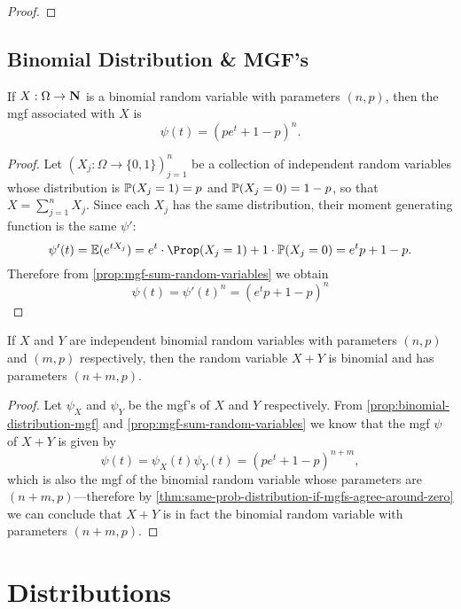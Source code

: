 \begin{proof}
\end{proof}

\subsection{Binomial Distribution \& MGF's}

\begin{proposition}
\label{prop:binomial-distribution-mgf}
If \(X: \Omega \to \mathbf{N}\) is a binomial random variable with parameters
\((n, p)\), then the mgf associated with \(X\) is
\[
\psi(t) = (p e^t + 1 - p)^n.
\]
\end{proposition}

\begin{proof}
Let \((X_j: \Omega \to \{0, 1\})_{j=1}^n\) be a collection of independent random
variables whose distribution is \(\operatorname{\mathbb{P}}(X_j = 1) = p\) and
\(\operatorname{\mathbb{P}}(X_j = 0) = 1 - p\), so that \(X = \sum_{j=1}^n X_j\). Since each \(X_j\)
has the same distribution, their moment generating function is the same \(\psi'\):
\[
\psi'(t)
= \Expect(e^{t X_j})
= e^t \cdot \Prop(X_j = 1) + 1 \cdot \Prob(X_j = 0)
= e^t p + 1 - p.
\]
Therefore from \cref{prop:mgf-sum-random-variables} we obtain
\[
\psi(t) = \psi'(t)^n = (e^t p + 1 - p)^n
\]
\end{proof}

\begin{theorem}
\label{thm:additivity-binomial-random-variables}
If \(X\) and \(Y\) are independent binomial random variables with parameters
\((n, p)\) and \((m, p)\) respectively, then the random variable \(X + Y\) is
binomial and has parameters \((n + m, p)\).
\end{theorem}

\begin{proof}
Let \(\psi_X\) and \(\psi_Y\) be the mgf's of \(X\) and \(Y\) respectively. From
\cref{prop:binomial-distribution-mgf} and \cref{prop:mgf-sum-random-variables} we
know that the mgf \(\psi\) of \(X + Y\) is given by
\[
\psi(t) = \psi_X(t) \psi_Y(t) = (p e^t + 1 - p)^{n+m},
\]
which is also the mgf of the binomial random variable whose parameters are
\((n+m, p)\)---therefore by
\cref{thm:same-prob-distribution-if-mgfs-agree-around-zero} we can conclude that
\(X + Y\) is in fact the binomial random variable with parameters \((n+m, p)\).
\end{proof}

\section{Distributions}

